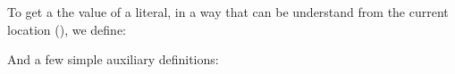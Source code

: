 \noindent To get a the value of a literal, in a way that can be understand from the current location (), we define:
\begin{defye}%
\end{defye}

\noindent And a few simple auxiliary definitions:
\begin{defye}%
\end{defye}

\newpage

\begin{comment}
Define p(P) = LV
-----------------------------------


p.exists(Ps) iff forall P in Ps: p(P) is defined

Define L(Cs) = L
--------------------------------------
L(empty) = L
L(C.Cs) = L(Cs)
    L = interface? {_; _, C = L, _; _}

Define L[CD]=L'
---------------------------------------------
L[C = E'] = interface? {Tz; MVs C = E' Ms; K?}
  L = interface? {Tz; MVs C = _ Ms; K?}


Define operations on p
--------------------------------------
p.evilPush(L) = (C = L, p)
	for fresh C

p.push(id) = (id = L, p)
    p = (id' = {_;_, id = L, _ ;_}, _; Ds)

(id = L, p).pop() = p
(id = L, p).top() = L

Define equivy ops...
------------------------------
empty =p empty
P, Ps =p P', Ps' iff:
	p.minimize(P) = p.minimize(P')
	Ps =p Ps'

Pz subseteq_p Pz' iff:
	p.minimize(Pz) subseteq p.minimize(Pz')

p.minimize(empty) = empty
p.minimize(P, Pz) = p.minimize(P), p.minimize(Pz)

p.minimize(Thisn+1.idn.Cs) = p.minimize(Thisn.Cs):
  p = id0 = L0, ..., idn = Ln, _; Ds
  p(Thisn.Cs) = L
  // TODO: Check that Ln is an L instead?

otherwise p.minimize(P) = P

define dom(Mz) = Midz
===========================================
dom(empty) = empty
dom(C = E, Mz) = C, dom(Mz)
dom(T m(Txs), Mz) = m, dom(Mz)
\end{comment}


